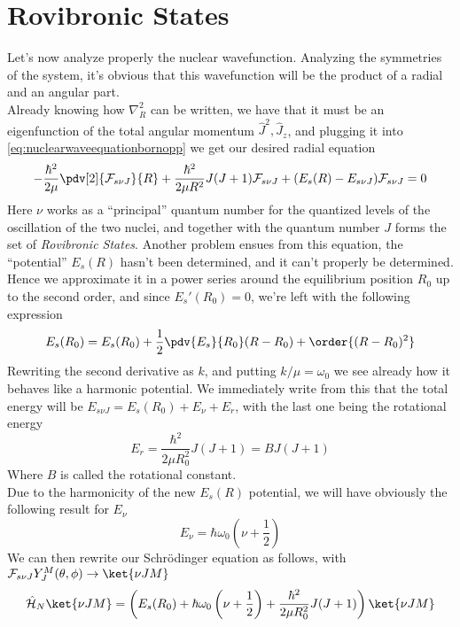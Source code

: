 \documentclass[a4paper, 11pt]{book}
\newcommand{\1}{\opr{\mathds{1}}}
\newcommand{\ham}{\mathcal{H}}
\newcommand{\opr}[1]{\hat{#1}}
\newcommand{\mc}[1]{\mathcal{#1}}
\theoremstyle{plain}
\begin{document}
	\section{Rovibronic States}
	Let's now analyze properly the nuclear wavefunction. Analyzing the symmetries of the system, it's obvious that this wavefunction will be the product of a radial and an angular part.\\
	Already knowing how $\nabla_R^2$ can be written, we have that it must be an eigenfunction of the total angular momentum $\opr{J}^2,\opr{J}_z$, and plugging it into \eqref{eq:nuclearwaveequationbornopp} we get our desired radial equation
	\begin{equation}
		-\frac{\hbar^2}{2\mu}\pdv[2]{\mc{F}_{s\nu J}}{R}+\frac{\hbar^2}{2\mu R^2}J(J+1)\mc{F}_{s\nu J}+(E_s(R)-E_{s\nu J})\mc{F}_{s\nu J}=0
		\label{eq:nucradeqbo}
	\end{equation}
	Here $\nu$ works as a ``principal'' quantum number for the quantized levels of the oscillation of the two nuclei, and together with the quantum number $J$ forms the set of \textit{Rovibronic States}. Another problem ensues from this equation, the ``potential'' $E_s(R)$ hasn't been determined, and it can't properly be determined. Hence we approximate it in a power series around the equilibrium position $R_0$ up to the second order, and since $E_s'(R_0)=0$, we're left with the following expression
	\begin{equation}
		E_s(R_0)=E_s(R_0)+\frac{1}{2}\pdv{E_s}{R_0}(R-R_0)+\order{(R-R_0)^2}
		\label{eq:espowerseriesbo}
	\end{equation}
	Rewriting the second derivative as $k$, and putting $k/\mu=\omega_0$ we see already how it behaves like a harmonic potential. We immediately write from this that the total energy will be $E_{s\nu J}=E_s(R_0)+E_{\nu}+E_r$, with the last one being the rotational energy
	\begin{equation*}
		E_r=\frac{\hbar^2}{2\mu R_0^2}J(J+1)=BJ(J+1)
	\end{equation*}
	Where $B$ is called the rotational constant.\\
	Due to the harmonicity of the new $E_s(R)$ potential, we will have obviously the following result for $E_{\nu}$
	\begin{equation*}
		E_{\nu}=\hbar\omega_0\left( \nu+\frac{1}{2} \right)
	\end{equation*}
	We can then rewrite our Schrödinger equation as follows, with $\mc{F}_{s\nu J}Y^M_J(\theta,\phi)\to\ket{\nu JM}$
	\begin{equation}
		\opr{\ham}_N\ket{\nu JM}=\left( E_s(R_0)+\hbar\omega_0\left( \nu+\frac{1}{2} \right)+\frac{\hbar^2}{2\mu R_0^2}J(J+1) \right)\ket{\nu JM}
		\label{eq:newnucschrbo}
	\end{equation}
\end{document}
